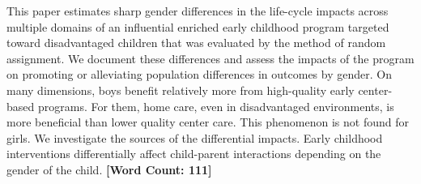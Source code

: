 \noindent This paper estimates sharp gender differences in the life-cycle impacts across multiple domains of an influential enriched early childhood program targeted toward disadvantaged children that was evaluated by the method of random assignment. We document these differences and assess the impacts of the program on promoting or alleviating population differences in outcomes by gender. On many dimensions, boys benefit relatively more from high-quality early center-based programs. For them, home care, even in disadvantaged environments, is more beneficial than lower quality center care. This phenomenon is not found for girls. We investigate the sources of the differential impacts. Early childhood interventions differentially affect child-parent interactions depending on the gender of the child. \textbf{[Word Count: 111]} 
